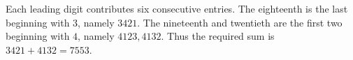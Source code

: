 Each leading digit contributes six consecutive entries. The eighteenth is the last beginning with $3$, namely $3421$. The nineteenth and twentieth are the first two beginning with $4$, namely $4123,4132$. Thus the required sum is $3421+4132=\boxed{7553}$.
